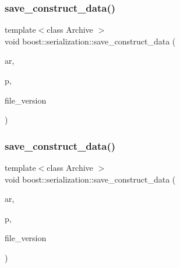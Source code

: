 \mbox{\label{namespaceboost_1_1serialization_aa5da5003acf4fa37f8c3b0f7c210f45f}} 
\subsubsection{\texorpdfstring{save\+\_\+construct\+\_\+data()}{save\_construct\_data()}\hspace{0.1cm}{\footnotesize\ttfamily [3/4]}}
{\footnotesize\ttfamily template$<$class Archive $>$ \\
void boost\+::serialization\+::save\+\_\+construct\+\_\+data (\begin{DoxyParamCaption}\item[{Archive \&}]{ar,  }\item[{const \hyperlink{classpan_1_1_card_impl}{pan\+::\+Card\+Impl}$<$ \hyperlink{namespacepan_a1f7350bfd0421afeabe9fa95c16fa811aa4ecfc70574394990cf17bd83df499f7}{pan\+::\+Card\+Type\+::\+Event} $>$ $\ast$}]{p,  }\item[{const unsigned int}]{file\+\_\+version }\end{DoxyParamCaption})\hspace{0.3cm}{\ttfamily [inline]}}

\mbox{\label{namespaceboost_1_1serialization_a0187526a4d05f2f351784cddd5b82b6c}} 
\subsubsection{\texorpdfstring{save\+\_\+construct\+\_\+data()}{save\_construct\_data()}\hspace{0.1cm}{\footnotesize\ttfamily [4/4]}}
{\footnotesize\ttfamily template$<$class Archive $>$ \\
void boost\+::serialization\+::save\+\_\+construct\+\_\+data (\begin{DoxyParamCaption}\item[{Archive \&}]{ar,  }\item[{const \hyperlink{classpan_1_1_player_base}{pan\+::\+Player\+Base} $\ast$}]{p,  }\item[{const unsigned int}]{file\+\_\+version }\end{DoxyParamCaption})\hspace{0.3cm}{\ttfamily [inline]}}

